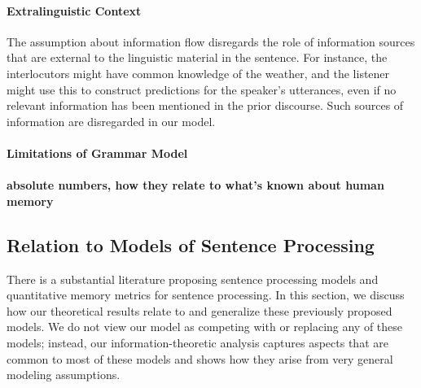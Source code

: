 \paragraph{Extralinguistic Context}
The assumption about information flow disregards the role of information sources that are external to the linguistic material in the sentence.
For instance, the interlocutors might have common knowledge of the weather, and the listener might use this to construct predictions for the speaker's utterances, even if no relevant information has been mentioned in the prior discourse.
Such sources of information are disregarded in our model.


\paragraph{Limitations of Grammar Model}

\paragraph{absolute numbers, how they relate to what's known about human memory}

\subsection{Relation to Models of Sentence Processing}
\label{sec:sentprod-models}

There is a substantial literature proposing sentence processing models and quantitative memory metrics for sentence processing.
In this section, we discuss how our theoretical results relate to and generalize these previously proposed models.
We do not view our model as competing with or replacing any of these models; instead, our information-theoretic analysis captures aspects that are common to most of these models and shows how they arise from very general modeling assumptions. 

